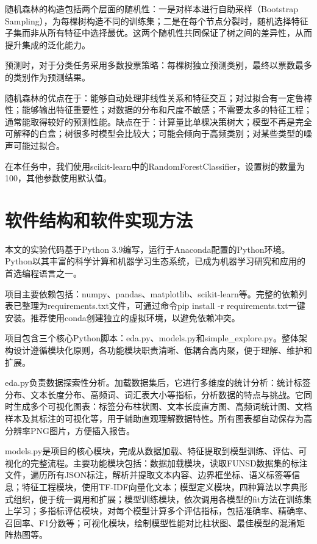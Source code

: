 \documentclass[12pt,a4paper]{article}
\begin{document}
随机森林的构造包括两个层面的随机性：一是对样本进行自助采样（Bootstrap Sampling），为每棵树构造不同的训练集；二是在每个节点分裂时，随机选择特征子集而非从所有特征中选择最优。这两个随机性共同保证了树之间的差异性，从而提升集成的泛化能力。

预测时，对于分类任务采用多数投票策略：每棵树独立预测类别，最终以票数最多的类别作为预测结果。

随机森林的优点在于：能够自动处理非线性关系和特征交互；对过拟合有一定鲁棒性；能够输出特征重要性；对数据的分布和尺度不敏感；不需要太多的特征工程；通常能取得较好的预测性能。缺点在于：计算量比单棵决策树大；模型不再是完全可解释的白盒；树很多时模型会比较大；可能会倾向于高频类别；对某些类型的噪声可能过拟合。

在本任务中，我们使用scikit-learn中的RandomForestClassifier，设置树的数量为100，其他参数使用默认值。

\section{软件结构和软件实现方法}

本文的实验代码基于Python 3.9编写，运行于Anaconda配置的Python环境。Python以其丰富的科学计算和机器学习生态系统，已成为机器学习研究和应用的首选编程语言之一\cite{Bird2009}。

项目主要依赖包括：numpy、pandas、matplotlib、scikit-learn等\cite{Pedregosa2011}。完整的依赖列表已整理为requirements.txt文件，可通过命令pip install -r requirements.txt一键安装。推荐使用conda创建独立的虚拟环境，以避免依赖冲突。

项目包含三个核心Python脚本：eda.py、models.py和simple_explore.py。整体架构设计遵循模块化原则，各功能模块职责清晰、低耦合高内聚，便于理解、维护和扩展。

eda.py负责数据探索性分析。加载数据集后，它进行多维度的统计分析：统计标签分布、文本长度分布、高频词、词汇表大小等指标，分析数据的特点与挑战。它同时生成多个可视化图表：标签分布柱状图、文本长度直方图、高频词统计图、文档样本及其标注的可视化等，用于辅助直观理解数据特性。所有图表都自动保存为高分辨率PNG图片，方便插入报告。

models.py是项目的核心模块，完成从数据加载、特征提取到模型训练、评估、可视化的完整流程。主要功能模块包括：数据加载模块，读取FUNSD数据集的标注文件，遍历所有JSON标注，解析并提取文本内容、边界框坐标、语义标签等信息；特征工程模块，使用TF-IDF向量化文本；模型定义模块，四种算法以字典形式组织，便于统一调用和扩展；模型训练模块，依次调用各模型的fit方法在训练集上学习；多指标评估模块，对每个模型计算多个评估指标，包括准确率、精确率、召回率、F1分数等；可视化模块，绘制模型性能对比柱状图、最佳模型的混淆矩阵热图等。
\end{document}
